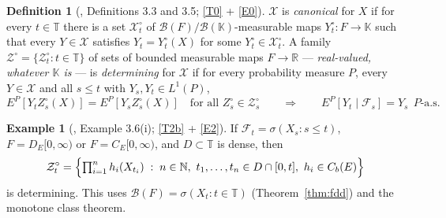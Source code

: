 \documentclass[11pt,a4paper]{article}
\theoremstyle{plain}
\theoremstyle{definition}
\newtheorem{definition}[theorem]{Definition}
\newtheorem{example}[theorem]{Example}
\theoremstyle{remark}
\newcommand{\R}{\mathbb{R}}
\newcommand{\N}{\mathbb{N}}
\newcommand{\T}{\mathbb{T}}                     %
\newcommand{\Bor}{\mathcal{B}}                 %
\newcommand{\Cb}{C_b}                          %
\newcommand{\DE}{D_E[0,\infty)}
\newcommand{\CE}{C_E[0,\infty)}
\newcommand{\Filt}{\mathcal{F}}
\newcommand{\K}{\mathbb{K}}
\newcommand{\XX}{\mathcal{X}}                  %
\newcommand{\ZZ}{\mathcal{Z}}                  %
\newcommand{\CPS}{\cite{CPS23}}
\begin{document}
\begin{definition}[\CPS, Definitions 3.3 and 3.5; \eqref{T0} + \eqref{E0}]
  \label{def:canonical}
  $\XX$ is \emph{canonical} for $X$ if for every $t \in \T$ there is a set
  $\XX^\circ_t$ of $\Bor(F)/\Bor(\K)$-measurable maps $Y^\circ_t : F \to \K$
  such that every $Y \in \XX$ satisfies $Y_t = Y^\circ_t(X)$ for some
  $Y^\circ_t \in \XX^\circ_t$.  A family
  $\ZZ^\circ = \{\ZZ^\circ_t : t \in \T\}$ of sets of bounded measurable maps
  $F \to \R$ --- \emph{real-valued, whatever $\K$ is} --- is \emph{determining}
  for $\XX$ if for every probability measure
  $P$, every $Y \in \XX$ and all $s \leq t$ with $Y_s, Y_t \in L^1(P)$,
  \[
    E^P[Y_t Z^\circ_s(X)] = E^P[Y_s Z^\circ_s(X)]
      \quad \text{for all } Z^\circ_s \in \ZZ^\circ_s
    \qquad \Longrightarrow \qquad
    E^P[Y_t \mid \Filt_s] = Y_s \ \ P\text{-a.s.}
  \]
\end{definition}

\begin{example}[\CPS, Example 3.6(i); \eqref{T2b} + \eqref{E2}]
  \label{ex:determining}
  If $\Filt_t = \sigma(X_s : s \leq t)$, $F = \DE$ or $F = \CE$, and
  $D \subset \T$ is dense, then
  \[
    \ZZ^\circ_t
    = \Bigl\{ \textstyle\prod_{i=1}^n h_i(X_{t_i}) \;:\;
        n \in \N,\ t_1,\dots,t_n \in D \cap [0,t],\ h_i \in \Cb(E) \Bigr\}
  \]
  is determining.  This uses $\Bor(F) = \sigma(X_t : t \in \T)$
  (Theorem~\ref{thm:fdd}) and the monotone class theorem.
\end{example}
\end{document}
